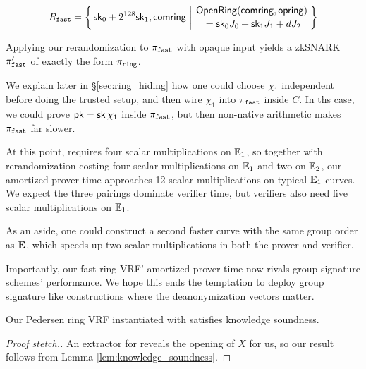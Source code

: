 $$ \Rfast = \Setst{ \sk_0 + 2^{128} \sk_1, \comring }{
 \eprint{ \exists d,\openring \textrm{\ s.t.\ } }{}
 \genfrac{}{}{0pt}{}{ \eprint{\rVRF.}{}\OpenRing(\comring,\openring) }{ \,\, = \sk_0 \genJ_0 + \sk_1 \genJ_1 + d \genJ_2 }
} $$ %

Applying our rerandomization to $\pi_{\mathtt{fast}}$ with opaque input yields
a zkSNARK $\pi_{\mathtt{fast}}'$ of exactly the form $\pi_{\mathtt{ring}}$.

We explain later in \S\ref{sec:ring_hiding} how one could
choose $\chi_1$ independent before doing the trusted setup,
 and then wire $\chi_1$ into $\pi_{\mathtt{fast}}$ inside $C$.
In ths case, we could prove $\mathsf{pk} = \mathsf{sk}\, \chi_1$ inside $\pi_{\mathtt{fast}}$, but then
non-native arithmetic makes $\pi_{\mathtt{fast}}$ far slower.

At this point, \PedVRF requires four scalar multiplications on ${\mathbb{E}}_1$,
so together with rerandomization costing four scalar multiplications
on ${\mathbb{E}}_1$ and two on ${\mathbb{E}}_2$, our amortized prover time
 approaches 12 scalar multiplications on typical ${\mathbb{E}}_1$ curves. 
We expect the three pairings dominate verifier time, but
 verifiers also need five scalar multiplications on ${\mathbb{E}}_1$.

As an aside, one could construct a second faster curve with the same
group order as ${\mathbf{E}}$, which speeds up two scalar multiplications
 in both the prover and verifier. 

Importantly, our fast ring VRF' amortized prover time now rivals
group signature schemes' performance.  We hope this ends the temptation
to deploy group signature like constructions where the deanonymization vectors matter.

\begin{theorem}\label{thm:knowledge_soundness}
Our Pedersen ring VRF instantiated with \pifast satisfies knowledge soundness.
\end{theorem}

\begin{proof}[Proof stetch.]
An extractor for \PedVRF reveals the opening of $X$ for us,
so our result follows from Lemma \ref{lem:knowledge_soundness}.
\end{proof}


%

